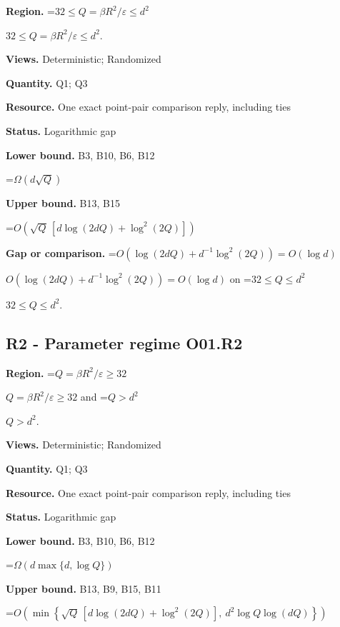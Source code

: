\documentclass[10pt,a4paper]{article}
\newcommand{\AtlasMath}[1]{\par\begingroup\centering\setbox0=\hbox{$\displaystyle #1$}\ifdim\wd0>1.4\linewidth\typeout{ATLAS WIDE FORMULA: \the\wd0}\fi\ifdim\wd0>\linewidth\resizebox{\linewidth}{!}{\box0}\else\box0\fi\par\endgroup}
\newcommand{\AtlasInlineMath}[1]{\begingroup\setbox0=\hbox{$#1$}\ifdim\wd0>.4\linewidth\endgroup\AtlasMath{#1}\else\endgroup$#1$\fi}
\begin{document}
\textbf{Region.} \AtlasInlineMath{32\le Q=\beta R^2/\varepsilon\le d^2}.



\textbf{Views.} Deterministic; Randomized



\textbf{Quantity.} Q1; Q3



\textbf{Resource.} One exact point-pair comparison reply, including ties



\textbf{Status.} Logarithmic gap



\textbf{Lower bound.} B3, B10, B6, B12



\AtlasMath{\Omega(d\sqrt Q)}


\textbf{Upper bound.} B13, B15



\AtlasMath{O\!\left(\sqrt Q\,[d\log(2dQ)+\log^2(2Q)]\right)}


\textbf{Gap or comparison.} \AtlasInlineMath{O(\log(2dQ)+d^{-1}\log^2(2Q))=O(\log d)} on \AtlasInlineMath{32\le Q\le d^2}.



\subsection{R2 - Parameter regime O01.R2}


\textbf{Region.} \AtlasInlineMath{Q=\beta R^2/\varepsilon\ge32} and \AtlasInlineMath{Q>d^2}.



\textbf{Views.} Deterministic; Randomized



\textbf{Quantity.} Q1; Q3



\textbf{Resource.} One exact point-pair comparison reply, including ties



\textbf{Status.} Logarithmic gap



\textbf{Lower bound.} B3, B10, B6, B12



\AtlasMath{\Omega(d\max\{d,\log Q\})}


\textbf{Upper bound.} B13, B9, B15, B11



\AtlasMath{O\!\left(\min\!\left\{\sqrt Q\,[d\log(2dQ)+\log^2(2Q)],\ d^2\log Q\log(dQ)\right\}\right)}
\end{document}
